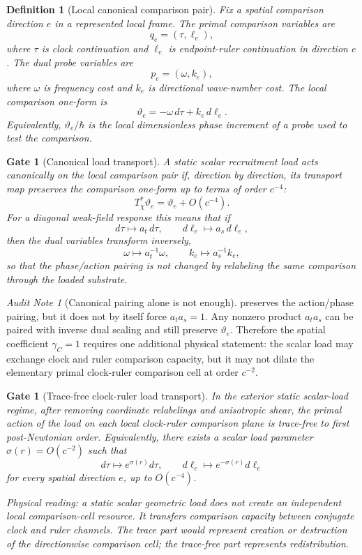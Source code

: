 \documentclass[11pt]{article}
\newtheorem{definition}[theorem]{Definition}
\newtheorem{gate}[theorem]{Gate}
\theoremstyle{remark}
\newtheorem{audit}[theorem]{Audit Note}
\begin{document}
\begin{definition}[Local canonical comparison pair]
Fix a spatial comparison direction \(e\) in a represented local frame.  The primal comparison variables are
\[
        q_e=(\tau,\ell_e),
\]
where \(\tau\) is clock continuation and \(\ell_e\) is endpoint-ruler continuation in direction \(e\).  The dual probe variables are
\[
        p_e=(\omega,k_e),
\]
where \(\omega\) is frequency cost and \(k_e\) is directional wave-number cost.  The local comparison one-form is
\[
        \vartheta_e=-\omega\,d\tau+k_e\,d\ell_e .
\]
Equivalently, \(\vartheta_e/\hbar\) is the local dimensionless phase increment of a probe used to test the comparison.
\end{definition}

\begin{gate}[Canonical load transport]
\label{gate:canonical-load-transport}
A static scalar recruitment load acts canonically on the local comparison pair if, direction by direction, its transport map preserves the comparison one-form up to terms of order \(c^{-4}\):
\[
        T_\chi^*\vartheta_e=\vartheta_e+O(c^{-4}).
\]
For a diagonal weak-field response this means that if
\[
        d\tau\mapsto a_t\,d\tau,
        \qquad
        d\ell_e\mapsto a_s\,d\ell_e,
\]
then the dual variables transform inversely,
\[
        \omega\mapsto a_t^{-1}\omega,
        \qquad
        k_e\mapsto a_s^{-1}k_e,
\]
so that the phase/action pairing is not changed by relabeling the same comparison through the loaded substrate.
\end{gate}

\begin{audit}[Canonical pairing alone is not enough]
\label{audit:canonical-not-enough}
 preserves the action/phase pairing, but it does not by itself force \(a_ta_s=1\).  Any nonzero product \(a_ta_s\) can be paired with inverse dual scaling and still preserve \(\vartheta_e\).  Therefore the spatial coefficient \(\gamma_C=1\) requires one additional physical statement: the scalar load may exchange clock and ruler comparison capacity, but it may not dilate the elementary primal clock-ruler comparison cell at order \(c^{-2}\).
\end{audit}

\begin{gate}[Trace-free clock-ruler load transport]
\label{gate:trace-free-transport}
In the exterior static scalar-load regime, after removing coordinate relabelings and anisotropic shear, the primal action of the load on each local clock-ruler comparison plane is trace-free to first post-Newtonian order.  Equivalently, there exists a scalar load parameter \(\sigma(r)=O(c^{-2})\) such that
\[
        d\tau\mapsto e^{\sigma(r)}d\tau,
        \qquad
        d\ell_e\mapsto e^{-\sigma(r)}d\ell_e
\]
for every spatial direction \(e\), up to \(O(c^{-4})\).

Physical reading: a static scalar geometric load does not create an independent local comparison-cell resource.  It transfers comparison capacity between conjugate clock and ruler channels.  The trace part would represent creation or destruction of the directionwise comparison cell; the trace-free part represents redistribution.
\end{gate}
\end{document}
